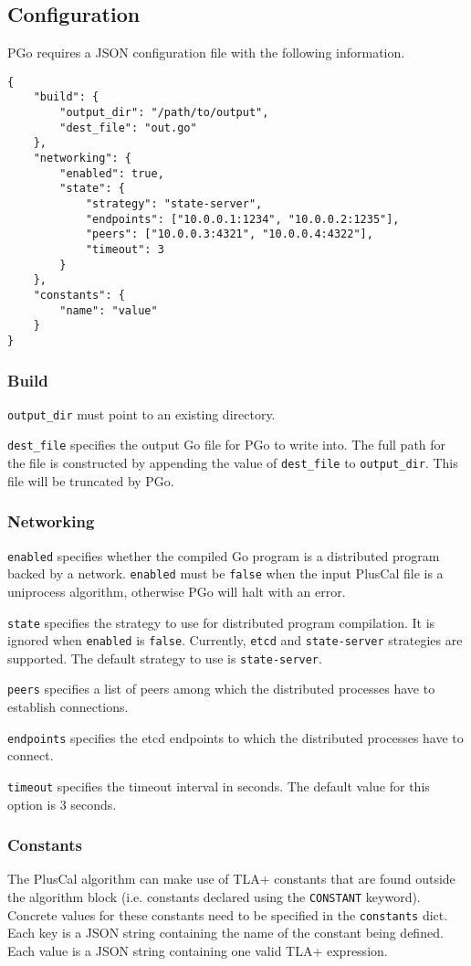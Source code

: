 \subsection{Configuration}
PGo requires a JSON configuration file with the following information.

\begin{lstlisting}
{
	"build": {
		"output_dir": "/path/to/output",
		"dest_file": "out.go"
	},
	"networking": {
		"enabled": true,
		"state": {
			"strategy": "state-server",
			"endpoints": ["10.0.0.1:1234", "10.0.0.2:1235"],
			"peers": ["10.0.0.3:4321", "10.0.0.4:4322"],
			"timeout": 3
		}
	},
	"constants": {
		"name": "value"
	}
}
\end{lstlisting}

\subsubsection{Build}
\noindent\lstinline|output_dir| must point to an existing directory.

\noindent\lstinline|dest_file| specifies the output Go file for PGo to write into. The full path for the file is constructed by appending the value of \lstinline|dest_file| to \lstinline|output_dir|. This file will be truncated by PGo.
\subsubsection{Networking}
\noindent\lstinline|enabled| specifies whether the compiled Go program is a distributed program backed by a network. \lstinline|enabled| must be \lstinline|false| when the input PlusCal file is a uniprocess algorithm, otherwise PGo will halt with an error.

\noindent\lstinline|state| specifies the strategy to use for distributed program compilation. It is ignored when \lstinline|enabled| is \lstinline|false|. Currently, \lstinline|etcd| and \lstinline|state-server| strategies are supported. The default strategy to use is \lstinline|state-server|.

\noindent\lstinline|peers| specifies a list of peers among which the distributed processes have to establish connections.

\noindent\lstinline|endpoints| specifies the etcd endpoints to which the distributed processes have to connect.

\noindent\lstinline|timeout| specifies the timeout interval in seconds. The default value for this option is 3 seconds.
\subsubsection{Constants}
The PlusCal algorithm can make use of TLA+ constants that are found outside the algorithm block (i.e. constants declared using the \lstinline[language=pcal]|CONSTANT| keyword). Concrete values for these constants need to be specified in the \lstinline|constants| dict. Each key is a JSON string containing the name of the constant being defined. Each value is a JSON string containing one valid TLA+ expression.


